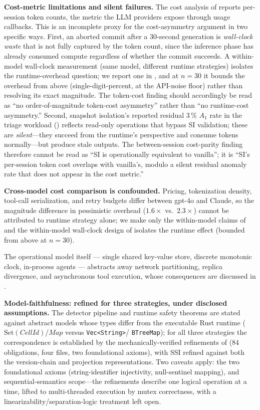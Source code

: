 \documentclass[journal,compsoc,10pt]{IEEEtran}
\theoremstyle{definition}
\theoremstyle{remark}
\newcommand{\fld}[1]{\mathit{#1}}
\begin{document}
\medskip
\noindent\textbf{Cost-metric limitations and silent failures.}
The cost analysis of  reports
per-session token counts, the metric the LLM providers
expose through usage callbacks. This is an incomplete
proxy for the cost-asymmetry argument in two specific ways.
First, an aborted commit after a 30-second generation is
\emph{wall-clock waste} that is not fully captured by the
token count, since the inference phase has already
consumed compute regardless of whether the commit succeeds.
A within-model wall-clock measurement (same model,
different runtime strategies) isolates the runtime-overhead
question; we report one in , and at
$n=30$ it bounds the overhead from above (single-digit-percent,
at the API-noise floor) rather than resolving its exact
magnitude. The token-cost finding should accordingly be read
as ``no order-of-magnitude token-cost asymmetry'' rather
than ``no runtime-cost asymmetry.''
Second, snapshot isolation's reported residual 3\,\% $A_1$
rate in the triage workload () reflects
read-only operations that bypass SI validation; these are
\emph{silent}---they succeed from the runtime's perspective
and consume tokens normally---but produce stale outputs.
The between-session cost-parity finding therefore cannot be read as
``SI is operationally equivalent to vanilla''; it is
``SI's per-session token cost overlaps with vanilla's,
modulo a silent residual anomaly rate that does not appear
in the cost metric.''

\medskip
\noindent\textbf{Cross-model cost comparison is confounded.}
Pricing, tokenization density, tool-call serialization, and retry budgets
differ between gpt-4o and Claude, so the magnitude difference in
pessimistic overhead ($1.6\times$ vs.\ $2.3\times$) cannot be attributed
to runtime strategy alone; we make only the within-model claims of
 and the within-model wall-clock design of
 isolates the runtime effect (bounded from above at
$n=30$).

The operational model itself --- single shared key-value store,
discrete monotonic clock, in-process agents --- abstracts away
network partitioning, replica divergence, and asynchronous tool
execution, whose consequences are discussed in .

\medskip
\noindent\textbf{Model-faithfulness: refined for three strategies,
under disclosed assumptions.}
The detector pipeline and runtime safety theorems are stated against
abstract models whose types differ from the executable Rust runtime
($\mathrm{Set}(\fld{CellId})$/$\fld{Map}$ versus \texttt{Vec<String>}/%
\texttt{BTreeMap}); for all three strategies the correspondence is
established by the mechanically-verified refinements of
 (84 obligations, four files, two foundational
axioms), with SSI refined against both the version-chain and projection
representations. Two caveats apply: the two foundational axioms
(string-identifier injectivity, null-sentinel mapping), and
sequential-semantics scope---the refinements describe one logical
operation at a time, lifted to multi-threaded execution by mutex
correctness, with a linearizability/separation-logic treatment left open.
\end{document}
